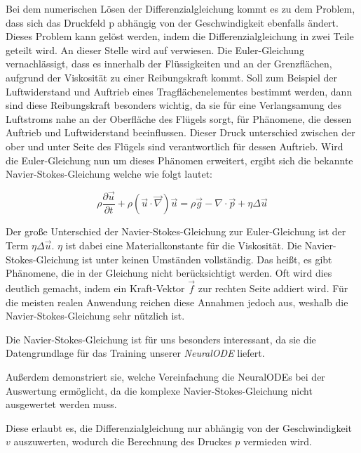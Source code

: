 Bei dem numerischen Lösen der Differenzialgleichung kommt es zu dem Problem, dass sich das Druckfeld p
abhängig von der Geschwindigkeit ebenfalls ändert.
Dieses Problem kann gelöst werden, indem die Differenzialgleichung in zwei Teile geteilt wird.
An dieser Stelle wird auf \cite{num_navier} verwiesen.
Die Euler-Gleichung vernachlässigt, dass es innerhalb der Flüssigkeiten und an der Grenzflächen,
aufgrund der Viskosität zu einer Reibungskraft kommt.
Soll zum Beispiel der Luftwiderstand und Auftrieb eines Tragflächenelementes bestimmt werden,
dann sind diese Reibungskraft besonders wichtig, da sie für eine Verlangsamung des Luftstroms nahe an der Oberfläche
des Flügels sorgt, für Phänomene, die dessen Auftrieb und Luftwiderstand beeinflussen.
Dieser Druck unterschied zwischen der ober und unter Seite des Flügels sind verantwortlich für dessen Auftrieb.
Wird die Euler-Gleichung nun um dieses Phänomen erweitert, 
ergibt sich die bekannte Navier-Stokes-Gleichung \cite[Kapitel~1.4]{navier_stokes} 
welche wie folgt lautet:

$$
\rho \frac{\partial \vec{u}}{\partial t} + \rho (\vec{u} \cdot \vec{\nabla} ) \vec{u} = 
\rho \vec{g} - \nabla \cdot \vec{p} + \eta \Delta \vec{u}
$$

Der große Unterschied der Navier-Stokes-Gleichung zur Euler-Gleichung ist der Term $\eta \Delta \vec{u}$.
$\eta$ ist dabei eine Materialkonstante für die Viskosität.
Die Navier-Stokes-Gleichung ist unter keinen Umständen vollständig.
Das heißt, es gibt Phänomene, die in der Gleichung nicht berücksichtigt werden.
Oft wird dies deutlich gemacht, indem ein Kraft-Vektor $\vec{f}$ zur rechten Seite addiert wird.
Für die meisten realen Anwendung reichen diese Annahmen jedoch aus, weshalb die Navier-Stokes-Gleichung sehr nützlich ist.

Die Navier-Stokes-Gleichung ist für uns besonders interessant, da sie die Datengrundlage für das Training unserer \textit{NeuralODE} liefert.

Außerdem demonstriert sie, welche Vereinfachung die NeuralODEs bei der Auswertung ermöglicht,
da die komplexe Navier-Stokes-Gleichung nicht ausgewertet werden muss.

Diese erlaubt es, die Differenzialgleichung nur abhängig von der Geschwindigkeit $v$ auszuwerten,
wodurch die Berechnung des Druckes $p$ vermieden wird.

